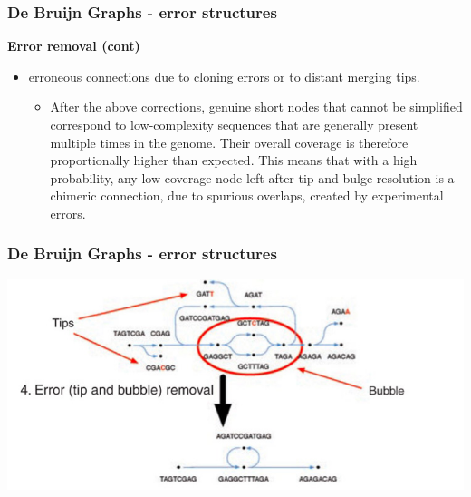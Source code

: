 \documentclass[pdf]{beamer}
\begin{document}
\begin{frame}
\frametitle{De Bruijn Graphs - error structures}
\textbf{Error removal (cont)}\\
\begin{itemize}
\item erroneous connections due to cloning errors or to distant merging tips.
\begin{itemize}
\item After the above corrections, genuine short nodes that cannot be simplified correspond to low-complexity sequences that are generally present multiple times in the genome. Their overall coverage is therefore proportionally higher than expected. This means that with a high probability, any low coverage node left after tip and bulge resolution is a chimeric connection, due to spurious overlaps, created by experimental errors.
\end{itemize}
\end{itemize}
\end{frame}

\begin{frame}
\frametitle{De Bruijn Graphs - error structures}
\begin{center}
\includegraphics[scale=0.45]{Figures/error-removal.png} 
\end{center}
\end{frame}
\end{document}
